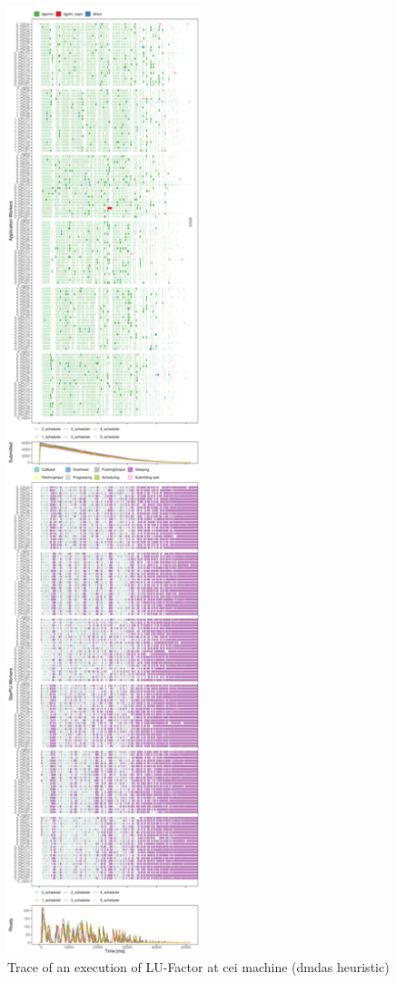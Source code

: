 \documentclass[conference, 10pt, final]{IEEEtran}
\begin{document}
\begin{figure}[ht]
\centering
\includegraphics[width=0.5\textwidth]{719448.pdf}
\caption{Trace of an execution of LU-Factor at cei machine (dmdas heuristic)}
\label{fig:trace}
\end{figure}
\end{document}
